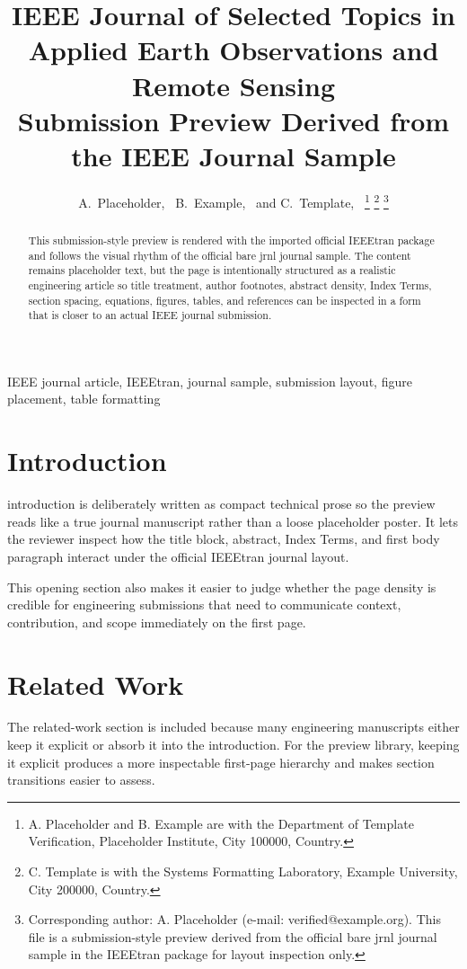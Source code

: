 \documentclass[journal]{IEEEtran}
\title{IEEE Journal of Selected Topics in Applied Earth Observations and Remote Sensing\\\large Submission Preview Derived from the IEEE Journal Sample}
\author{A.~Placeholder,~\IEEEmembership{Member,~IEEE,}%
B.~Example,~\IEEEmembership{Senior Member,~IEEE,}%
and C.~Template,~\IEEEmembership{Member,~IEEE}%
\thanks{A. Placeholder and B. Example are with the Department of Template Verification, Placeholder Institute, City 100000, Country.}%
\thanks{C. Template is with the Systems Formatting Laboratory, Example University, City 200000, Country.}%
\thanks{Corresponding author: A. Placeholder (e-mail: verified@example.org). This file is a submission-style preview derived from the official bare jrnl journal sample in the IEEEtran package for layout inspection only.}}
\begin{document}
\maketitle
\begin{abstract}
This submission-style preview is rendered with the imported official IEEEtran package and follows the visual rhythm of the official bare jrnl journal sample. The content remains placeholder text, but the page is intentionally structured as a realistic engineering article so title treatment, author footnotes, abstract density, Index Terms, section spacing, equations, figures, tables, and references can be inspected in a form that is closer to an actual IEEE journal submission.
\end{abstract}
\begin{IEEEkeywords}
IEEE journal article, IEEEtran, journal sample, submission layout, figure placement, table formatting
\end{IEEEkeywords}
\section{Introduction}
 introduction is deliberately written as compact technical prose so the preview reads like a true journal manuscript rather than a loose placeholder poster. It lets the reviewer inspect how the title block, abstract, Index Terms, and first body paragraph interact under the official IEEEtran journal layout.

This opening section also makes it easier to judge whether the page density is credible for engineering submissions that need to communicate context, contribution, and scope immediately on the first page.
\section{Related Work}
The related-work section is included because many engineering manuscripts either keep it explicit or absorb it into the introduction. For the preview library, keeping it explicit produces a more inspectable first-page hierarchy and makes section transitions easier to assess.
\end{document}
